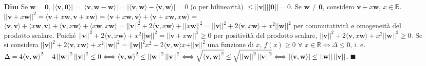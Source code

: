 \documentclass{article}
\begin{document}
\textbf{Dim} Se $\mathbf{w=0}$, $\left\vert \langle \mathbf{v,0\rangle }%
\right\vert =\left\vert \langle \mathbf{v,w-w\rangle }\right\vert
=\left\vert \langle \mathbf{v,w\rangle }-\langle \mathbf{v,w\rangle }%
\right\vert =0$ (o per bilinearit\`{a}) $\leq \left\vert \left\vert \mathbf{v%
}\right\vert \right\vert \left\vert \left\vert \mathbf{0}\right\vert
\right\vert =0$. Se $\mathbf{w\neq 0}$, considero $\mathbf{v}+x\mathbf{w}$, $%
x\in 
\mathbb{R}
$. $\left\vert \left\vert \mathbf{v}+x\mathbf{w}\right\vert \right\vert
^{2}=\langle \mathbf{v}+x\mathbf{w,v}+x\mathbf{w\rangle =}\langle \mathbf{v}%
+x\mathbf{w,v\rangle +}\langle \mathbf{v}+x\mathbf{w,}x\mathbf{w\rangle =}$ $%
\langle \mathbf{v,v\rangle +}\langle x\mathbf{w,v\rangle +}\langle \mathbf{v,%
}x\mathbf{w\rangle +}\langle x\mathbf{w,}x\mathbf{w\rangle =}\left\vert
\left\vert \mathbf{v}\right\vert \right\vert ^{2}+2\langle \mathbf{v,}x%
\mathbf{w\rangle +}\left\vert \left\vert x\mathbf{w}\right\vert \right\vert
^{2}=\left\vert \left\vert \mathbf{v}\right\vert \right\vert ^{2}+2\langle 
\mathbf{v,}x\mathbf{w\rangle +}x^{2}\left\vert \left\vert \mathbf{w}%
\right\vert \right\vert ^{2}$ per commutativit\`{a} e omogeneit\`{a} del
prodotto scalare. Poich\'{e} $\left\vert \left\vert \mathbf{v}\right\vert
\right\vert ^{2}+2\langle \mathbf{v,}x\mathbf{w\rangle +}x^{2}\left\vert
\left\vert \mathbf{w}\right\vert \right\vert ^{2}=\left\vert \left\vert 
\mathbf{v}+x\mathbf{w}\right\vert \right\vert ^{2}\geq 0$ per positivit\`{a}
del prodotto scalare, $\left\vert \left\vert \mathbf{v}\right\vert
\right\vert ^{2}+2\langle \mathbf{v,}x\mathbf{w\rangle +}x^{2}\left\vert
\left\vert \mathbf{w}\right\vert \right\vert ^{2}\geq 0$. Se si considera $%
\left\vert \left\vert \mathbf{v}\right\vert \right\vert ^{2}+2\langle 
\mathbf{v,}x\mathbf{w\rangle +}x^{2}\left\vert \left\vert \mathbf{w}%
\right\vert \right\vert ^{2}=\left\vert \left\vert \mathbf{w}\right\vert
\right\vert ^{2}x^{2}+2\langle \mathbf{v,w\rangle }x\mathbf{+}\left\vert
\left\vert \mathbf{v}\right\vert \right\vert ^{2}$ una funzione di $x$, $%
f\left( x\right) \geq 0$ $\forall $ $x\in 
\mathbb{R}
\Longleftrightarrow \Delta \leq 0$, i. e. $\Delta =4\langle \mathbf{%
v,w\rangle }^{2}-4\left\vert \left\vert \mathbf{w}\right\vert \right\vert
^{2}\left\vert \left\vert \mathbf{v}\right\vert \right\vert ^{2}\leq
0\Longleftrightarrow \langle \mathbf{v,w\rangle }^{2}\leq \left\vert
\left\vert \mathbf{w}\right\vert \right\vert ^{2}\left\vert \left\vert 
\mathbf{v}\right\vert \right\vert ^{2}\Longleftrightarrow \sqrt{\langle 
\mathbf{v,w\rangle }^{2}}\leq \sqrt{\left\vert \left\vert \mathbf{w}%
\right\vert \right\vert ^{2}\left\vert \left\vert \mathbf{v}\right\vert
\right\vert ^{2}}\Longleftrightarrow \left\vert \langle \mathbf{v,w\rangle }%
\right\vert \leq \left\vert \left\vert \mathbf{w}\right\vert \right\vert
\left\vert \left\vert \mathbf{v}\right\vert \right\vert $. $\blacksquare $
\end{document}
